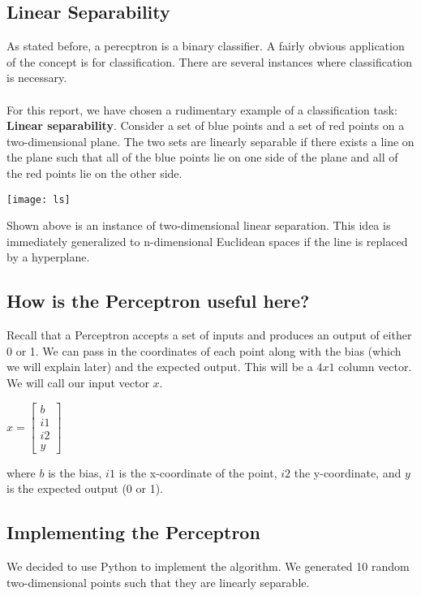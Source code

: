 \subsection{Linear Separability}

As stated before, a perecptron is a binary classifier. A fairly obvious application of the concept is for classification. There are several instances where classification is necessary. \\ \\
For this report, we have chosen a rudimentary example of a classification task: \textbf{Linear separability}. Consider a set of blue points and a set of red points on a two-dimensional plane. The two sets are linearly separable if there exists a line on the plane such that all of the blue points lie on one side of the plane and all of the red points lie on the other side. \\

\begin{center}
	\texttt{[image: ls]}
\end{center}
Shown above is an instance of two-dimensional linear separation. This idea is immediately generalized to n-dimensional Euclidean spaces if the line is replaced by a hyperplane.

\subsection{How is the Perceptron useful here?}
Recall that a Perceptron accepts a set of inputs and produces an output of either 0 or 1. We can pass in the coordinates of each point along with the bias (which we will explain later) and the expected output. This will be a $4x1$ column vector. We will call our input vector $x$. \\

	\begin{center}
		$x = 
		\begin{bmatrix}
			b \\
			i1 \\
			i2 \\
			y
		\end{bmatrix}
		$
	\end{center}
where $b$ is the bias, $i1$ is the x-coordinate of the point, $i2$ the y-coordinate, and $y$ is the expected output (0 or 1). \\

\subsection{Implementing the Perceptron}
We decided to use Python to implement the algorithm. We generated 10 random two-dimensional points such that they are linearly separable. \\


